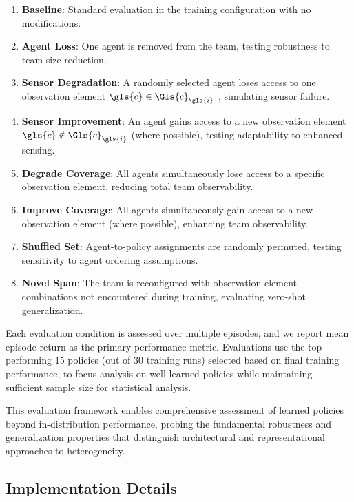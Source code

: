 \begin{enumerate}
    \item \textbf{Baseline}: 
    Standard evaluation in the training configuration with no modifications.
    \item \textbf{Agent Loss}: 
    One agent is removed from the team, testing robustness to team size reduction.
    \item \textbf{Sensor Degradation}: 
    A randomly selected agent loses access to one observation element 
    \(\gls{c}\in\Gls{c}_{\gls{i}}\) , simulating sensor failure.
    \item \textbf{Sensor Improvement}: 
    An agent gains access to a new observation element \(\gls{c}\notin\Gls{c}_{\gls{i}}\) 
    (where possible), testing adaptability to enhanced sensing.
    \item \textbf{Degrade Coverage}: 
    All agents simultaneously lose access to a specific observation element, 
    reducing total team observability.
    \item \textbf{Improve Coverage}: 
    All agents simultaneously gain access to a 
    new observation element (where possible), enhancing team observability.
    \item \textbf{Shuffled Set}: 
    Agent-to-policy assignments are randomly permuted, testing sensitivity 
    to agent ordering assumptions.
    \item \textbf{Novel Span}: 
    The team is reconfigured with observation-element combinations not 
    encountered during training, evaluating zero-shot generalization.
\end{enumerate}

Each evaluation condition is assessed over multiple episodes, 
and we report mean episode return as the primary performance metric. 
Evaluations use the top-performing 15 policies (out of 30 training runs) 
selected based on final training performance, 
to focus analysis on well-learned policies while maintaining sufficient 
sample size for statistical analysis. 

This evaluation framework enables comprehensive assessment of 
learned policies beyond in-distribution performance, probing the 
fundamental robustness and generalization properties that distinguish 
architectural and representational approaches to heterogeneity.

\subsection{Implementation Details}

